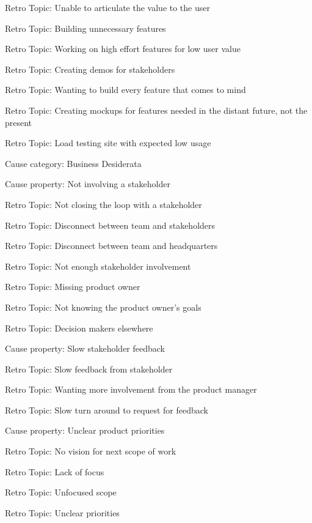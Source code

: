 \quad \quad \quad Retro Topic: Unable to articulate the value to the user

\quad \quad \quad Retro Topic: Building unnecessary features

\quad \quad \quad Retro Topic: Working on high effort features for low user value

\quad \quad \quad Retro Topic: Creating demos for stakeholders

\quad \quad \quad Retro Topic: Wanting to build every feature that comes to mind

\quad \quad \quad Retro Topic: Creating mockups for features needed in the distant future, not the present

\quad \quad \quad Retro Topic: Load testing site with expected low usage

\quad Cause category: Business Desiderata

\quad \quad Cause property: Not involving a stakeholder

\quad \quad \quad Retro Topic: Not closing the loop with a stakeholder

\quad \quad \quad Retro Topic: Disconnect between team and stakeholders

\quad \quad \quad Retro Topic: Disconnect between team and headquarters

\quad \quad \quad Retro Topic: Not enough stakeholder involvement

\quad \quad \quad Retro Topic: Missing product owner

\quad \quad \quad Retro Topic: Not knowing the product owner's goals

\quad \quad \quad Retro Topic: Decision makers elsewhere

\quad \quad Cause property: Slow stakeholder feedback

\quad \quad \quad Retro Topic: Slow feedback from stakeholder

\quad \quad \quad Retro Topic: Wanting more involvement from the product manager

\quad \quad \quad Retro Topic: Slow turn around to request for feedback

\quad \quad Cause property: Unclear product priorities

\quad \quad \quad Retro Topic: No vision for next scope of work

\quad \quad \quad Retro Topic: Lack of focus

\quad \quad \quad Retro Topic: Unfocused scope

\quad \quad \quad Retro Topic: Unclear priorities

